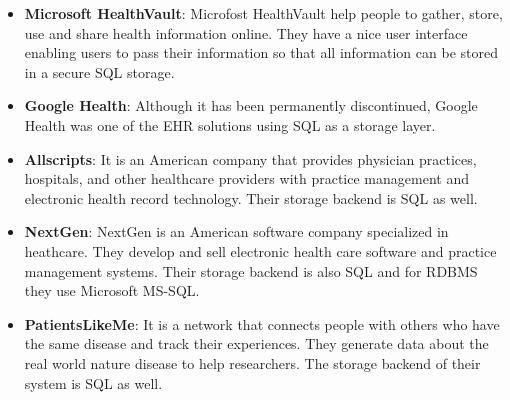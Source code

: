 \documentclass{article}
\begin{document}
\begin{itemize}
	\item \textbf{Microsoft HealthVault}: Microfost HealthVault help people to gather, store, use and share health information online\cite{online13}. They have a nice user interface enabling users to pass their information so that all information can be stored in a secure SQL storage\cite{online14}.
	\item \textbf{Google Health}: Although it has been permanently discontinued\cite{online15}, Google Health was one of the EHR solutions using SQL as a storage layer\cite{online16}.
	\item \textbf{Allscripts}: It is an American company that provides physician practices, hospitals, and other healthcare providers with practice management and electronic health record technology\cite{online21}. Their storage backend is SQL as well\cite{online22}.
	\item \textbf{NextGen}: NextGen is an American software company specialized in heathcare. They develop and sell electronic health care software and practice management systems\cite{online17}. Their storage backend is also SQL and for RDBMS they use Microsoft MS-SQL\cite{online18}.
	\item \textbf{PatientsLikeMe}: It is a network that connects people with others who have the same disease and track their experiences. They generate data about the real world nature disease to help researchers\cite{online19}. The storage backend of their system is SQL as well\cite{online20}. 
\end{itemize}




\end{document}
